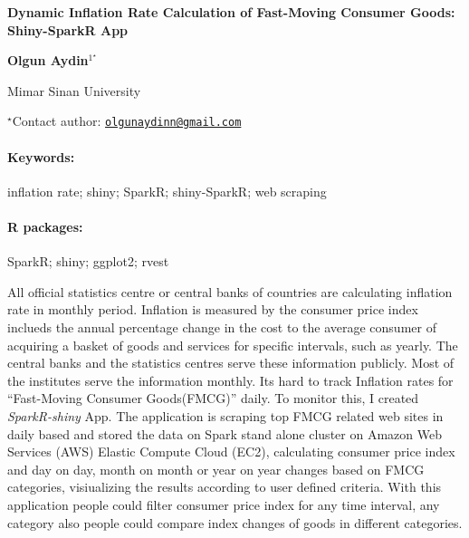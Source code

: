\documentclass[11pt, a4paper]{article}
\renewcommand{\title}[1]{\begin{center}{\bf \LARGE #1}\end{center}}
\newcommand{\keywords}{\paragraph{Keywords:}}
\newcommand{\packages}{\paragraph{R packages:}}
\begin{document}
\pagestyle{empty}

\title{Dynamic Inflation Rate Calculation of Fast-Moving Consumer Goods:
Shiny-SparkR App}

\begin{center}
  {\bf Olgun Aydin$^{1^\star}$}
\end{center}

\vskip 0.3cm

\begin{affiliations}
\begin{enumerate}
\begin{minipage}{0.915\textwidth}
\centering
\item Mimar Sinan University \\[-2pt]
\end{minipage}
\end{enumerate}
$^\star$Contact author: \href{mailto:olgunaydinn@gmail.com}{\nolinkurl{olgunaydinn@gmail.com}}\\
\end{affiliations}

\vskip 0.5cm

\begin{minipage}{0.915\textwidth}
\keywords inflation rate; shiny; SparkR; shiny-SparkR; web scraping
\packages SparkR; shiny; ggplot2; rvest
\end{minipage}

\vskip 0.8cm

All official statistics centre or central banks of countries are
calculating inflation rate in monthly period. Inflation is measured by
the consumer price index inclueds the annual percentage change in the
cost to the average consumer of acquiring a basket of goods and services
for specific intervals, such as yearly. The central banks and the
statistics centres serve these information publicly. Most of the
institutes serve the information monthly. Its hard to track Inflation
rates for ``Fast-Moving Consumer Goods(FMCG)'' daily. To monitor this, I
created \emph{SparkR-shiny} App. The application is scraping top FMCG
related web sites in daily based and stored the data on Spark stand
alone cluster on Amazon Web Services (AWS) Elastic Compute Cloud (EC2),
calculating consumer price index and day on day, month on month or year
on year changes based on FMCG categories, visiualizing the results
according to user defined criteria. With this application people could
filter consumer price index for any time interval, any category also
people could compare index changes of goods in different categories.
\end{document}
